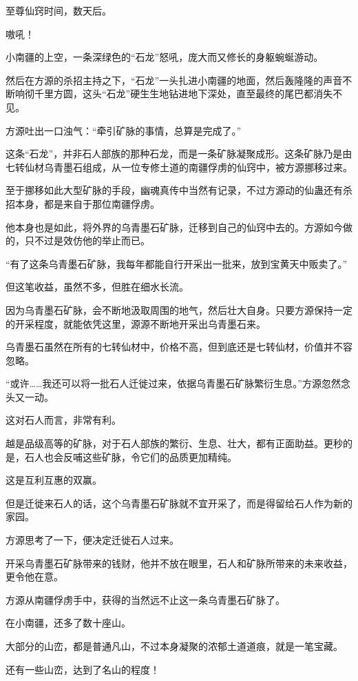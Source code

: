 \begin{this_body}
至尊仙窍时间，数天后。

嗷吼！

小南疆的上空，一条深绿色的“石龙”怒吼，庞大而又修长的身躯蜿蜒游动。

然后在方源的杀招主持之下，“石龙”一头扎进小南疆的地面，然后轰隆隆的声音不断响彻千里方圆，这头“石龙”硬生生地钻进地下深处，直至最终的尾巴都消失不见。

方源吐出一口浊气：“牵引矿脉的事情，总算是完成了。”

这条“石龙”，并非石人部族的那种石龙，而是一条矿脉凝聚成形。这条矿脉乃是由七转仙材乌青墨石组成，从一位专修土道的南疆俘虏的仙窍中，被方源挪移过来。

至于挪移如此大型矿脉的手段，幽魂真传中当然有记录，不过方源动的仙蛊还有杀招本身，都是来自于那位南疆俘虏。

他本身也是如此，将外界的乌青墨石矿脉，迁移到自己的仙窍中去的。方源如今做的，只不过是效仿他的举止而已。

“有了这条乌青墨石矿脉，我每年都能自行开采出一批来，放到宝黄天中贩卖了。”

但这笔收益，虽然不多，但胜在细水长流。

因为乌青墨石矿脉，会不断地汲取周围的地气，然后壮大自身。只要方源保持一定的开采程度，就能依凭这里，源源不断地开采出乌青墨石来。

乌青墨石虽然在所有的七转仙材中，价格不高，但到底还是七转仙材，价值并不容忽略。

“或许……我还可以将一批石人迁徙过来，依据乌青墨石矿脉繁衍生息。”方源忽然念头又一动。

这对石人而言，非常有利。

越是品级高等的矿脉，对于石人部族的繁衍、生息、壮大，都有正面助益。更秒的是，石人也会反哺这些矿脉，令它们的品质更加精纯。

这是互利互惠的双赢。

但是迁徙来石人的话，这个乌青墨石矿脉就不宜开采了，而是得留给石人作为新的家园。

方源思考了一下，便决定迁徙石人过来。

开采乌青墨石矿脉带来的钱财，他并不放在眼里，石人和矿脉所带来的未来收益，更令他在意。

方源从南疆俘虏手中，获得的当然远不止这一条乌青墨石矿脉了。

在小南疆，还多了数十座山。

大部分的山峦，都是普通凡山，不过本身凝聚的浓郁土道道痕，就是一笔宝藏。

还有一些山峦，达到了名山的程度！


\end{this_body}

